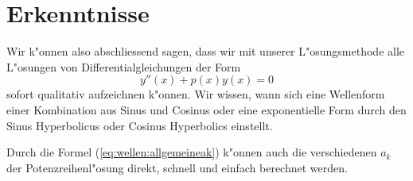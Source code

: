 \section{Erkenntnisse}

Wir k"onnen also abschliessend sagen, dass wir mit unserer L"osungsmethode alle 
L"osungen von Differentialgleichungen der Form 
\begin{equation*}
	y''(x)+p(x)y(x) = 0
\end{equation*}
sofort qualitativ aufzeichnen k"onnen. Wir wissen, wann sich eine Wellenform 
einer Kombination aus Sinus und Cosinus oder eine exponentielle Form durch den 
Sinus Hyperbolicus oder Cosinus Hyperbolics einstellt.

Durch die Formel (\ref{eq:wellen:allgemeineak}) k"onnen auch die verschiedenen 
$a_k$ der Potenzreihenl"osung direkt, schnell und einfach berechnet werden.